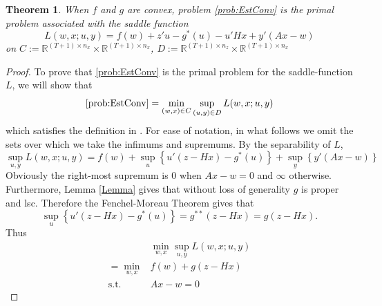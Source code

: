 \documentclass[12pt]{article}
\newcommand{\R}{{\mathbb R}}
\newtheorem{theorem}{Theorem}[section]
\theoremstyle{remark}
\theoremstyle{remark}
\begin{document}
\begin{theorem}
When $f$  and $g$ are convex, problem
\eqref{prob:EstConv} 
is the primal problem associated with the saddle function 
$$L(w, x; u, y) = f(w) + z'u - g^{*} (u) - u'Hx + y'(Ax - w)$$
on $C:= \R^{(T+1) \times n_{x}} \times \R^{(T+1)\times n_{x}}$,
$D:= \R^{(T+1)\times n_{z}} \times \R^{(T+1) \times n_{x}}$
\end{theorem}
\begin{proof}
To prove that \eqref{prob:EstConv} is the primal problem for the
saddle-function $L$, we will show that 
$$\eqref{prob:EstConv} = \min_{(w,x) \in C} \sup_{(u, y) \in D} L(w,x;u,y)$$
which satisfies the definition in \cite{ConjDual}. For ease of
notation, in what follows we omit the sets over which we take the infimums and
supremums.
By the separability of $L$, 
$$\sup_{u,y} L(w,x; u,y) = f(w) + \sup_{u}\left\{ u'(z-Hx) - g^{*}(u)
\right\}  + \sup_{y}\left\{ y'(Ax-w) \right\}$$
Obviously the right-most supremum is $0$ when $Ax -w=0$ and $\infty$
otherwise. Furthermore, Lemma \ref{Lemma} gives that without loss of
generality $g$ is proper and lsc. Therefore the 
Fenchel-Moreau Theorem \cite[Th 11.1]{VarAnal} gives that
$$\sup_{u} \left\{ u'(z-Hx) - g^{*}(u) \right\} = g^{**}(z-Hx) =
g(z-Hx).$$
Thus
\begin{align*}
&\min_{w,x} \sup_{u,y} L(w,x;u,y) \\
= \min_{w,x} & f(w) + g(z-Hx) \\
\text{s.t. } & Ax-w = 0
\end{align*}
\end{proof}
\end{document}
